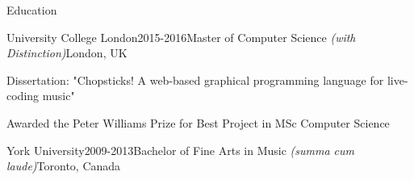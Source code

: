 \documentclass{resume} %
\begin{document}
\begin{rSection}{Education}
    
    \begin{rSubsection}{{University College London}}{2015-2016}{Master of Computer Science {\em (with Distinction)}}{London, UK} 
        \item Dissertation: "Chopsticks! A web-based graphical programming language for live-coding music"
        \item Awarded the Peter Williams Prize for Best Project in MSc Computer Science
    \end{rSubsection}
    
    
    \begin{rSubsection}{{York University}}{2009-2013}{Bachelor of Fine Arts in Music {\em (summa cum laude)}}{Toronto, Canada}
        \item[]
    \end{rSubsection}
    
\end{rSection}
    








\end{document}
